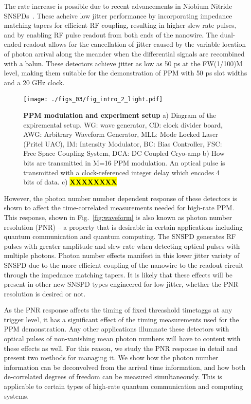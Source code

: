 \documentclass{optica-article}
\begin{document}
The rate increase is possible due to recent advancements in Niobium Nitride SNSPDs~\cite{Colangelo2023}. These acheive low jitter performance by incorporating impedance matching tapers for efficient RF coupling, resulting in higher slew rate pulses, and by enabling RF pulse readout from both ends of the nanowire. The dual-ended readout allows for the cancellation of jitter caused by the variable location of photon arrival along the meander when the differential signals are recombined with a balun. These detectors achieve jitter as low as 50 ps at the FW(1/100)M level, making them suitable for the demonstration of PPM with 50 ps slot widths and a 20 GHz clock.

\hypertarget{fig:intro}{%
\begin{figure}
\centering
\texttt{[image: ./figs\_03/fig\_intro\_2\_light.pdf]}
\caption[{PPM modulation and experiment setup}]{\textbf{PPM modulation and experiment setup} a) Diagram of the expiremental setup. WG: wave generator, CD: clock divider board, AWG: Arbitrary Waveform Generator, MLL: Mode Locked Laser (Pritel UAC), IM: Intensity Modulator, BC: Bias Controller, FSC: Free Space Coupling System, DCA: DC Coupled Cryo-amp b) How bits are transmitted in M=16 PPM modulation. An optical pulse is transmitted with a clock-referenced integer delay which encodes 4 bits of data. c) \textbf{\hl{XXXXXXXX}}}
\label{fig:intro}
\end{figure}
}

However, the photon number number dependent response of these detectors is shown to affect the time-correlated measurements needed for high-rate PPM. This response, shown in Fig.~\ref{fig:waveform} is also known as photon number resolution (PNR) -- a property that is desirable in certain applications including quantum communication and quantum computing.
The SNSPD generates RF pulses with greater amplitude and slew rate when detecting optical pulses with multiple photons. Photon number effects manifest in this lower jitter variety of SNSPD due to the more efficient coupling of the nanowire to the readout circuit through the impedance matching tapers. It is likely that these effects will be present in other new SNSPD types engineered for low jitter, whether the PNR resolution is desired or not.

As the PNR response affects the timing of fixed threashold timetaggs at any trigger level, it has a significant effect of the timing measurements used for the PPM demonstration. Any other applications illumnate these detectors with optical pulses of non-vanishing mean photon numbers will have to content with these effects as well. For this reason, we study the PNR response in detail and present two methods for managing it. We show how the photon number information can be deconvolved from the arrival time information, and how both de-correlated degrees of freedom can be measured simultaneously. This is applicable to certain types of high-rate quantum communication and computing systems.
\end{document}
